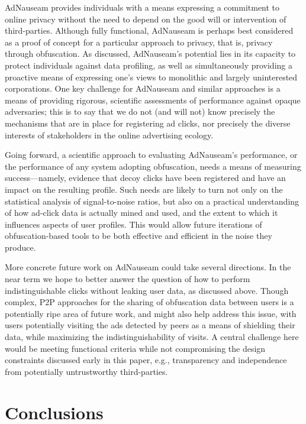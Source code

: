 \documentclass[conference]{IEEEtran}
\begin{document}
AdNauseam provides individuals with a means expressing a commitment to online privacy without the need to depend on the good will or intervention of third-parties. Although fully functional, AdNauseam is perhaps best considered as a proof of concept for a particular approach to privacy, that is, privacy through obfuscation. As discussed, AdNauseam's potential lies in its capacity to protect individuals against data profiling, as well as simultaneously providing a proactive means of expressing one's views to monolithic and largely uninterested corporations. One key challenge for AdNauseam and similar approaches is a means of providing rigorous, scientific assessments of performance against opaque adversaries; this is to say that we do not (and will not) know precisely the mechanisms that are in place for registering ad clicks, nor precisely the diverse interests of stakeholders in the online advertising ecology.

Going forward, a scientific approach to evaluating AdNauseam's performance, or the performance of any system adopting obfuscation, needs a means of measuring success---namely, evidence that decoy clicks have been registered and have an impact on the resulting profile. Such needs are likely to turn not only on the statistical analysis of signal-to-noise ratios, but also on a practical understanding of how ad-click data is actually mined and used, and the extent to which it influences aspects of user profiles. This would allow future iterations of obfuscation-based tools to be both effective and efficient in the noise they produce.

More concrete future work on AdNauseam could take several directions. In the near term we hope to better answer the question of how to perform indistinguishable clicks without leaking user data, as discussed above. Though complex, P2P approaches for the sharing of obfuscation data between users is a potentially ripe area of future work, and might also help address this issue, with users potentially visiting the ads detected by peers as a means of shielding their data, while maximizing the indistinguishability of visits. A central challenge here would be meeting functional criteria while not compromising the design constraints discussed early in this paper, e.g., transparency and independence from potentially untrustworthy third-parties.

\section{Conclusions}
\end{document}
